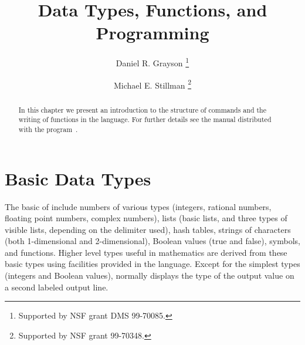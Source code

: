\title{Data Types, Functions, and Programming}
\author{Daniel R. Grayson%
        \thanks{Supported by NSF grant DMS 99-70085.}
   \and Michael E. Stillman%
        \thanks{Supported by NSF grant 99-70348.}}

\maketitle

\begin{abstract}
  In this chapter we present an introduction to the structure of \Mtwo
  commands and the writing of functions in the \Mtwo language.  For further details
  see the \Mtwo manual distributed with the program~\cite{M2}.
\end{abstract}

\section{Basic Data Types}

The basic  of \Mtwo include numbers of various types (integers,
rational numbers, floating point numbers, complex numbers), lists (basic
lists, and three types of visible lists, depending on the delimiter used),
hash tables, strings of characters (both 1-dimensional and 2-dimensional),
Boolean values (true and false), symbols, and functions.  Higher level types
useful in mathematics are derived from these basic types using facilities
provided in the \Mtwo language.  Except for the simplest types (integers and
Boolean values), \Mtwo normally displays the type of the output value on a
second labeled output line.

